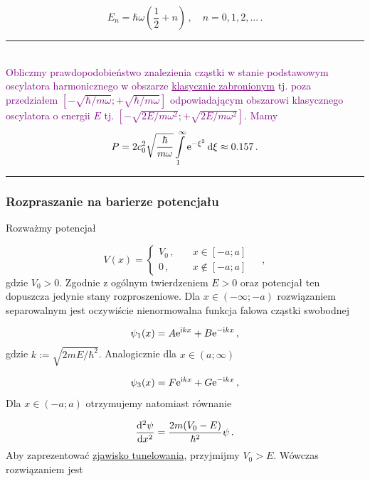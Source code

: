 \documentclass{myclass}
\begin{document}
\begin{equation*}
    E_n=\hbar\omega\left(\frac{1}{2}+n\right)\,,\quad n=0,1,2,...\,.
\end{equation*}

\noindent\rule{\columnwidth}{0.5pt}\\
\textcolor{purple}
{Obliczmy prawdopodobieństwo znalezienia cząstki w stanie podstawowym oscylatora harmonicznego w
obszarze \underline{klasycznie zabronionym} tj. poza przedziałem
\([-\sqrt{\hbar/m\omega};+\sqrt{\hbar/m\omega}]\) odpowiadającym obszarowi klasycznego oscylatora o
energii \(E\) tj. \([-\sqrt{2E/m\omega^2};+\sqrt{2E/m\omega^2}]\). Mamy
\begin{equation*}
    P=2c_0^2\sqrt{\frac{\hbar}{m\omega}}\int\limits_1^\infty\mathrm{e}^{-\xi^2}\dd{\xi}\approx0.157\,.
\end{equation*}}
\noindent\rule{\columnwidth}{0.5pt}

\subsubsection{Rozpraszanie na barierze potencjału}

Rozważmy potencjał

\begin{equation*}
    V(x)=\begin{cases} 
        V_0\,,&\quad x\in[-a;a]\\
        0\,,&\quad x\notin[-a;a]
    \end{cases}\quad\,,
\end{equation*}
gdzie \(V_0>0\). Zgodnie z ogólnym twierdzeniem \(E>0\) oraz potencjał ten dopuszcza jedynie stany
rozproszeniowe. Dla \(x\in(-\infty;-a)\) rozwiązaniem separowalnym jest oczywiście nienormowalna
funkcja falowa cząstki swobodnej

\begin{equation*}
    \psi_1(x)=A\mathrm{e}^{\mathrm{i} kx}+B\mathrm{e}^{-\mathrm{i} kx}\,,
\end{equation*}
gdzie \(k:=\sqrt{2mE/\hbar^2}\). Analogicznie dla \(x\in(a;\infty)\)

\begin{equation*}
\psi_3(x)=F\mathrm{e}^{\mathrm{i} kx}+G\mathrm{e}^{-\mathrm{i} kx}\,,
\end{equation*}
Dla \(x\in(-a;a)\) otrzymujemy natomiast równanie

\begin{equation*}
    \dv[2]{\psi}{x}=\frac{2m(V_0-E)}{\hbar^2}\psi\,.
\end{equation*}
Aby zaprezentować \underline{zjawisko tunelowania}, przyjmijmy \(V_0>E\). Wówczas rozwiązaniem jest
\end{document}
